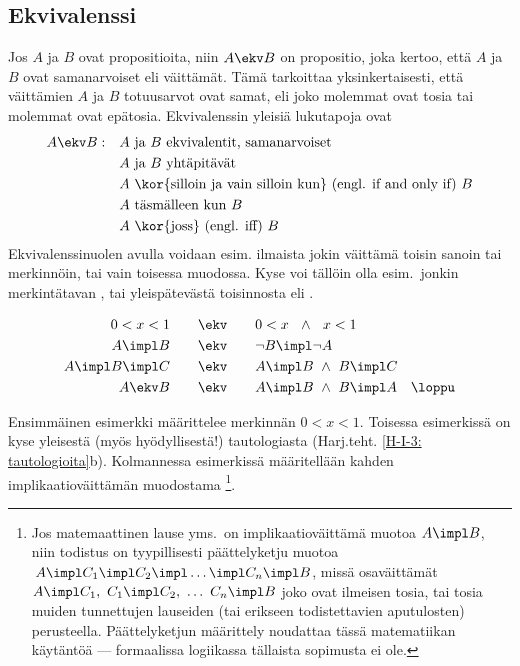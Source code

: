 \subsection*{Ekvivalenssi}
%
 
Jos $A$ ja $B$ ovat propositioita, niin $A \ekv B$ on propositio, joka kertoo, että $A$ ja $B$ 
ovat samanarvoiset eli  väittämät. Tämä tarkoittaa yksinkertaisesti, että
väittämien $A$ ja $B$ totuusarvot ovat samat, eli joko molemmat ovat tosia tai molemmat ovat 
epätosia. Ekvivalenssin yleisiä lukutapoja ovat
\begin{align*}
A \ekv B: \quad &\text{$A$ ja $B$ ekvivalentit, samanarvoiset} \\
                &\text{$A$ ja $B$ yhtäpitävät} \\
                &\text{$A$ \kor{silloin ja vain silloin kun} (engl. if and only if) $B$} \\
                &\text{$A$ täsmälleen kun $B$} \\
                &\text{$A$ \kor{joss} (engl. iff) $B$}
\end{align*} 
Ekvivalenssinuolen avulla voidaan esim. ilmaista jokin väittämä toisin sanoin tai merkinnöin, 
tai vain toisessa muodossa. Kyse voi tällöin olla esim.\ jonkin merkintätavan 
, tai yleispätevästä toisinnosta eli
. 
\begin{Exa} \label{ekvivalensseja}
\begin{align*}
0< x < 1 \quad\quad          &\ekv \quad\quad 0 < x\ \ \wedge\ \ x < 1 \\
A \impl B \quad\quad         &\ekv \quad\quad \neg B \impl \neg A \\
A \impl B \impl C \quad\quad &\ekv \quad\quad A \impl B\ \wedge\ B \impl C \\
A \ekv B \quad\quad          &\ekv \quad\quad A \impl B\ \wedge\ B \impl A \quad \loppu
\end{align*} \end{Exa}
Ensimmäinen esimerkki määrittelee merkinnän $0<x<1$. Toisessa esimerkissä on kyse yleisestä 
(myös hyödyllisestä!) tautologiasta (Harj.teht. \ref{H-I-3: tautologioita}b). Kolmannessa 
esimerkissä määritellään kahden implikaatioväittämän muodostama 
%
\footnote[2]{Jos matemaattinen lause yms.\ on implikaatioväittämä muotoa 
$A \impl B$, niin todistus on tyypillisesti päättelyketju muotoa
$\,A \impl C_1 \impl C_2 \impl \ldots \impl C_n \impl B$, missä osaväittämät
$A \impl C_1,\ C_1 \impl C_2,\ \ldots\ C_n \impl B$ joko ovat ilmeisen tosia, tai tosia muiden 
tunnettujen lauseiden (tai erikseen todistettavien aputulosten) perusteella. Päättelyketjun
määrittely noudattaa tässä matematiikan käytäntöä --- formaalissa logiikassa tällaista
sopimusta ei ole.}. 
